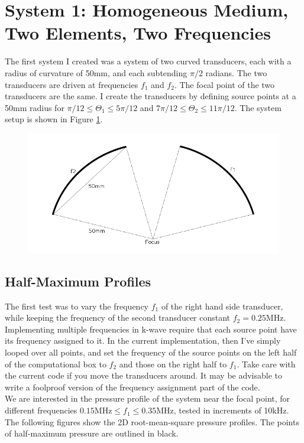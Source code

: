 \documentclass[10pt,a4paper]{article}
\begin{document}
\section{System 1: Homogeneous Medium, Two Elements, Two Frequencies}

The first system I created was a system of two curved transducers, each with a radius of curvature of 50mm, and each subtending $\pi/2$ radians. The two transducers are driven at frequencies $f_1$ and $f_2$. The focal point of the two transducers are the same. I create the transducers by defining source points at a 50mm radius for $\pi/12 \leq \Theta_1 \leq 5\pi/12$ and $7\pi/12 \leq \Theta_2 \leq 11 \pi/12$. The system setup is shown in Figure \ref{setup1}.

\begin{figure}[!h]\label{setup1}
\centering
\includegraphics[scale=0.5]{setup1.png}
\centering
\end{figure}

\subsection{Half-Maximum Profiles}

The first test was to vary the frequency $f_1$ of the right hand side transducer, while keeping the frequency of the second transducer constant $f_2 = 0.25$MHz. Implementing multiple frequencies in k-wave require that each source point have its frequency assigned to it. In the current implementation, then I've simply looped over all points, and set the frequency of the source points on the left half of the computational box to $f_2$ and those on the right half to $f_1$. Take care with the current code if you move the transducers around. It may be advisable to write a foolproof version of the frequency assignment part of the code.\\

We are interested in the pressure profile of the system near the focal point, for different frequencies $0.15 \text{MHz} \leq f_1 \leq 0.35 \text{MHz}$, tested in increments of 10kHz. The following figures show the 2D root-mean-square pressure profiles. The points of half-maximum pressure are outlined in black.
\end{document}
